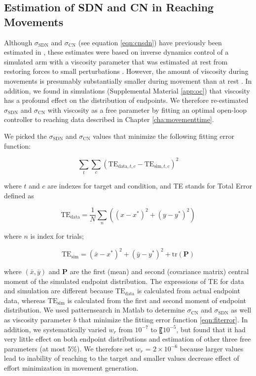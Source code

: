 \subsection{Estimation of SDN and CN in Reaching Movements}
Although $\sigma_{\text{SDN}}$ and $\sigma_{\text{CN}}$ (see equation \ref{eqn:cnsdn}) have previously been estimated in \cite{VanBeers2004}, these estimates were based on inverse dynamics control of a simulated arm with a viscosity parameter that was estimated at rest from restoring forces to small perturbations \cite{Gomi1998}. 
However, the amount of viscosity during movements is presumably substantially smaller during movement than at rest \cite{Burdet2013}. 
In addition, we found in simulations (Supplemental Material \ref{app:oc}) that viscosity has a profound effect on the distribution of endpoints.  
We therefore re-estimated $\sigma_{\text{SDN}}$ and $\sigma_{\text{CN}}$ with viscosity as a free parameter by fitting an optimal open-loop controller to reaching data described in Chapter \ref{cha:movementtime}.

We picked the $\sigma_{\text{SDN}}$ and $\sigma_{\text{CN}}$ values that minimize the following fitting error function:

\begin{equation}
\label{eqn:fiterror}
\sum_{t}\sum_{c} (\text{TE}_{\text{data},t,c} - \text{TE}_{\text{sim},t,c})^2
\end{equation}

where $t$ and $c$ are indexes for target and condition, and TE stands for Total Error defined as 

\begin{equation}
\text{TE}_{\text{data}} = \frac1N\sum_n \left( (x - x^*)^2 + (y - y^*)^2 \right) 
\end{equation}

where $n$ is index for trials;

\begin{equation}
\text{TE}_{\text{sim}} = (\bar{x} - x^*)^2 + (\bar{y} - y^*)^2 + \text{tr}(\bm{P})
\end{equation}

where $(\bar{x},\bar{y})$ and $\bm{P}$ are the first (mean) and second (covariance matrix) central moment of the simulated endpoint distribution. 
The expressions of TE for data and simulation are different because $\text{TE}_{\text{data}}$ is calculated from actual endpoint data, whereas $\text{TE}_{\text{sim}}$ is calculated from the first and second moment of endpoint distribution.
We used \textsf{patternsearch} in Matlab to determine $\sigma_{\text{CN}}$ and $\sigma_{\text{SDN}}$ as well as viscosity parameter $ b $ that minimize the fitting error function \ref{eqn:fiterror}. 
In addition, we systematically varied $ w_r $ from $ 10^{-7} $ to 〖$ 10^{-5} $, but found that it had very little effect on both endpoint distributions and estimation of other three free parameters (at most 5\%). We therefore set $ w_r $ = $ 2\times 10^{-6} $ because larger values lead to inability of reaching to the target and smaller values decrease effect of effort minimization in movement generation. 
		
